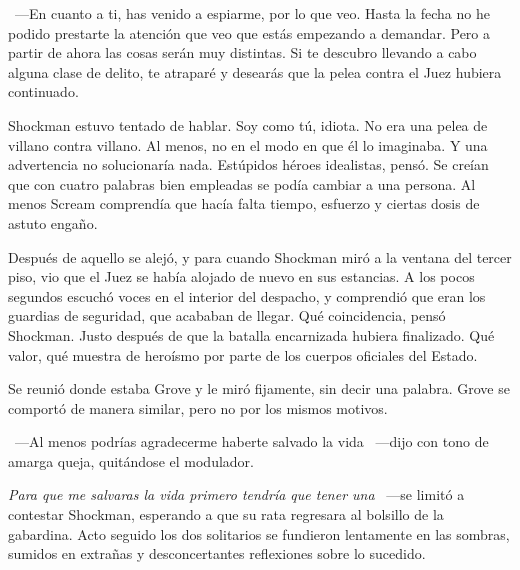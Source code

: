 ~---En cuanto a ti, has venido a espiarme, por lo que veo. Hasta la fecha no he podido prestarte la atención que veo que estás empezando a demandar. Pero a partir de ahora las cosas serán muy distintas. Si te descubro llevando a cabo alguna clase de delito, te atraparé y desearás que la pelea contra el Juez hubiera continuado.

Shockman estuvo tentado de hablar. Soy como tú, idiota. No era una pelea de villano contra villano. Al menos, no en el modo en que él lo imaginaba. Y una advertencia no solucionaría nada. Estúpidos héroes idealistas, pensó. Se creían que con cuatro palabras bien empleadas se podía cambiar a una persona. Al menos Scream comprendía que hacía falta tiempo, esfuerzo y ciertas dosis de astuto engaño.

Después de aquello se alejó, y para cuando Shockman miró a la ventana del tercer piso, vio que el Juez se había alojado de nuevo en sus estancias. A los pocos segundos escuchó voces en el interior del despacho, y comprendió que eran los guardias de seguridad, que acababan de llegar. Qué coincidencia, pensó Shockman. Justo después de que la batalla encarnizada hubiera finalizado. Qué valor, qué muestra de heroísmo por parte de los cuerpos oficiales del Estado.

Se reunió donde estaba Grove y le miró fijamente, sin decir una palabra. Grove se comportó de manera similar, pero no por los mismos motivos.

~---Al menos podrías agradecerme haberte salvado la vida ~---dijo con tono de amarga queja, quitándose el modulador.

\emph{Para que me salvaras la vida primero tendría que tener una} ~---se limitó a contestar Shockman, esperando a que su rata regresara al bolsillo de la gabardina. Acto seguido los dos solitarios se fundieron lentamente en las sombras, sumidos en extrañas y desconcertantes reflexiones sobre lo sucedido.
